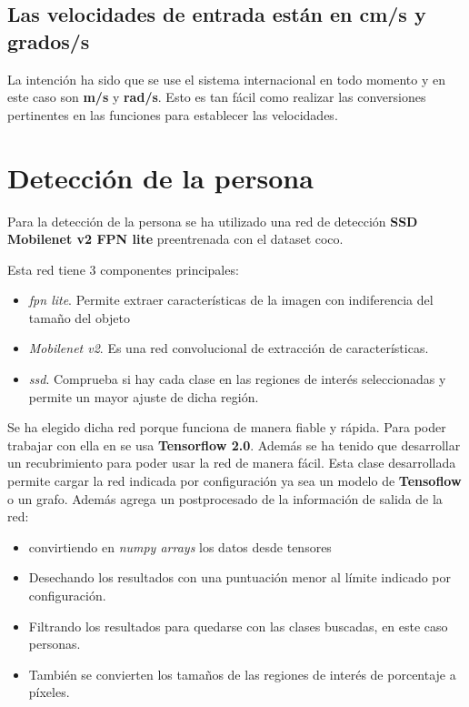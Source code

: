 \subsection{Las velocidades de entrada están en \textbf{cm/s} y \textbf{grados/s}}
La intención ha sido que se use el sistema internacional en todo momento y en este caso son \textbf{m/s} y \textbf{rad/s}.
Esto es tan fácil como realizar las conversiones pertinentes en las funciones para establecer las velocidades.

\section{Detección de la persona}
Para la detección de la persona se ha utilizado una red de detección \textbf{SSD Mobilenet v2 FPN lite} preentrenada con el dataset coco.

Esta red tiene 3 componentes principales: 
\begin{itemize}
  \item \textit{\gls{fpn} lite}\cite{fpn}. Permite extraer características de la imagen con indiferencia del tamaño del objeto 
  \item \textit{Mobilenet v2}. Es una red convolucional de extracción de características.
  \item \textit{\gls{ssd}\cite{ssd}}. Comprueba si hay cada clase en las regiones de interés seleccionadas y permite un mayor ajuste de dicha región.
\end{itemize}
Se ha elegido dicha red porque funciona de manera fiable y rápida. Para poder trabajar con ella en se usa \textbf{Tensorflow 2.0}. Además se ha tenido que desarrollar un recubrimiento para poder usar la red de manera fácil.
Esta clase desarrollada permite cargar la red indicada por configuración ya sea un modelo de \textbf{Tensoflow} o un grafo. Además agrega un postprocesado de la información de salida de la red: 

\begin{itemize}
  \item convirtiendo en \textit{numpy arrays} los datos desde tensores
  \item Desechando los resultados con una puntuación menor al límite indicado por configuración.
  \item Filtrando los resultados para quedarse con las clases buscadas, en este caso personas.
  \item También se convierten los tamaños de las regiones de interés de porcentaje a píxeles.
\end{itemize}

